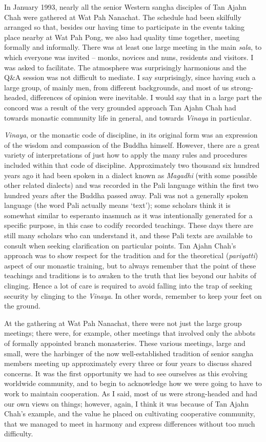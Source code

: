 In January 1993, nearly all the senior Western sangha disciples of Tan
Ajahn Chah were gathered at Wat Pah Nanachat. The schedule had been
skilfully arranged so that, besides our having time to participate in
the events taking place nearby at Wat Pah Pong, we also had quality time
together, meeting formally and informally. There was at least one large
meeting in the main \emph{sala}, to which everyone was invited -- monks,
novices and nuns, residents and visitors. I was asked to facilitate. The
atmosphere was surprisingly harmonious and the Q\&A session was not
difficult to mediate. I say surprisingly, since having such a large
group, of mainly men, from different backgrounds, and most of us
strong-headed, differences of opinion were inevitable. I would say that
in a large part the concord was a result of the very grounded
approach Tan Ajahn Chah had towards monastic community life in general,
and towards \emph{Vinaya} in particular.

\emph{Vinaya}, or the monastic code of discipline, in its original form
was an expression of the wisdom and compassion of the Buddha himself.
However, there are a great variety of interpretations of just how to
apply the many rules and procedures included within that code of
discipline. Approximately two thousand six hundred years ago it had been
spoken in a dialect known as \emph{Magadhi} (with some possible other
related dialects) and was recorded in the Pali language within the first
two hundred years after the Buddha passed away. Pali was not a generally
spoken language (the word Pali actually means `text'); some scholars
think it is somewhat similar to esperanto\cite{esperanto}
inasmuch as it was intentionally generated for a specific
purpose, in this case to codify recorded teachings. These days there are
still many scholars who can understand it, and these Pali texts are
available to consult when seeking clarification on particular points.
Tan Ajahn Chah's approach was to show respect for the tradition and for
the theoretical (\emph{pariyatti}) aspect of our monastic training, but
to always remember that the point of these teachings and traditions is
to awaken to the truth that lies beyond our habits of clinging. Hence a
lot of care is required to avoid falling into the trap of seeking
security by clinging to the \emph{Vinaya}. In other words, remember to
keep your feet on the ground.

At the gathering at Wat Pah Nanachat, there were not just the large
group meetings; there were, for example, other meetings that involved
only the abbots of formally appointed branch monasteries. These various
meetings, large and small, were the harbinger of the now
well-established tradition of senior sangha members meeting up
approximately every three or four years to discuss shared concerns. It
was the first opportunity we had to see ourselves as this evolving
worldwide community, and to begin to acknowledge how we were going to
have to work to maintain cooperation. As I said, most of us were
strong-headed and had our own views on things; however, again, I think
it was because of Tan Ajahn Chah's example, and the value he placed on
cultivating cooperative community, that we managed to meet in harmony
and express differences without too much difficulty.

